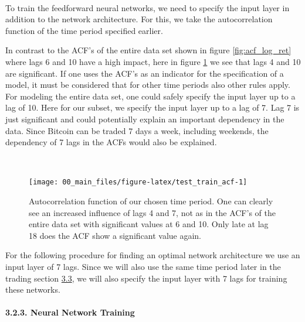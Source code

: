 \documentclass[
]{article}
\begin{document}
~

To train the feedforward neural networks, we need to specify the input
layer in addition to the network architecture. For this, we take the
autocorrelation function of the time period specified earlier.

In contrast to the ACF's of the entire data set shown in figure
\ref{fig:acf_log_ret} where lags 6 and 10 have a high impact, here in
figure \ref{fig:test_train_acf} we see that lags 4 and 10 are
significant. If one uses the ACF's as an indicator for the specification
of a model, it must be considered that for other time periods also other
rules apply. For modeling the entire data set, one could safely specify
the input layer up to a lag of 10. Here for our subset, we specify the
input layer up to a lag of 7. Lag 7 is just significant and could
potentially explain an important dependency in the data. Since Bitcoin
can be traded 7 days a week, including weekends, the dependency of 7
lags in the ACFs would also be explained.

~

\begin{figure}

{\centering \texttt{[image: 00\_main\_files/figure-latex/test\_train\_acf-1]} 

}

\caption{Autocorrelation function of our chosen time period. One can clearly see an increased influence of lags 4 and 7, not as in the ACF's of the entire data set with significant values at 6 and 10. Only late at lag 18 does the ACF show a significant value again.}\label{fig:test_train_acf}
\end{figure}

For the following procedure for finding an optimal network architecture
we use an input layer of 7 lags. Since we will also use the same time
period later in the trading section
\protect\hyperlink{trading-strat}{3.3}, we will also specify the input
layer with 7 lags for training these networks.

\newpage

\hypertarget{train-nn}{%
\paragraph{3.2.3. Neural Network Training}\label{train-nn}}

~
\end{document}
